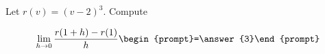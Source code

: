 \documentclass{ximera}
\author{Bart Snapp}
\begin{document}
\begin{exercise}
Let $r(v) = (v-2)^3$. Compute

\[
\lim_{ h\to 0 } \frac{r(1+h)-r(1)}{h} \begin{prompt}=\answer{3}\end{prompt}
\]
\end{exercise}
\end{document}
